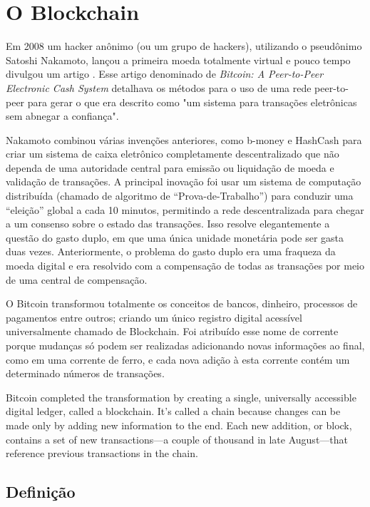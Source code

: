    
\section[]{O Blockchain}

    
    Em 2008 um hacker anônimo (ou um grupo de hackers), utilizando o pseudônimo Satoshi Nakamoto, lançou a primeira moeda totalmente virtual e pouco tempo divulgou um artigo \cite{bitcoin_satoshi}. Esse artigo denominado de \textit{Bitcoin: A Peer-to-Peer Electronic Cash System} detalhava os métodos para o uso de uma rede peer-to-peer para gerar o que era descrito como "um sistema para transações eletrônicas sem abnegar a confiança".
    
    Nakamoto combinou várias invenções anteriores, como b-money e HashCash para criar um sistema de caixa eletrônico completamente descentralizado que não dependa de uma autoridade central para emissão ou liquidação de moeda e validação de transações. A principal inovação foi usar um sistema de computação distribuída (chamado de algoritmo de “Prova-de-Trabalho”) para conduzir uma “eleição” global a cada 10 minutos, permitindo a rede descentralizada para chegar a um consenso sobre o estado das transações. Isso resolve elegantemente a questão do gasto duplo, em que uma única unidade monetária pode ser gasta duas vezes. Anteriormente, o problema do gasto duplo era uma fraqueza da moeda digital e era resolvido com a compensação de todas as transações por meio de uma central de compensação.\cite{mastering_blockchain_andreas}
    
    O Bitcoin transformou totalmente os conceitos de bancos, dinheiro, processos de pagamentos entre outros; criando um único registro digital acessível universalmente chamado de Blockchain. Foi atribuído esse nome de corrente porque mudanças só podem ser realizadas adicionando novas informações ao final, como em uma corrente de ferro, e cada nova adição à esta corrente contém um determinado números de transações.

    Bitcoin completed the transformation by creating a single, universally accessible digital ledger, called a blockchain. It’s called a chain because changes can be made only by adding new information to the end. Each new addition, or block, contains a set of new transactions—a couple of thousand in late August—that reference previous transactions in the chain.



    \subsection{Definição}
    
